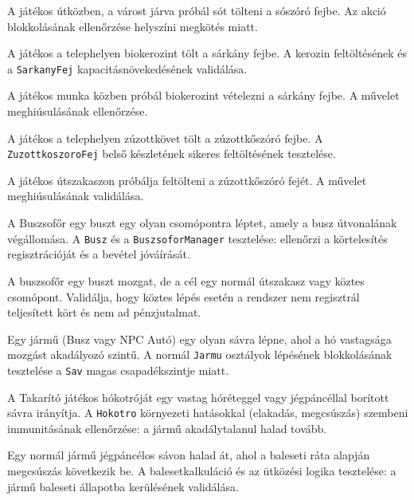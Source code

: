 {A játékos útközben, a várost járva próbál sót tölteni a sószóró fejbe.}
{Az akció blokkolásának ellenőrzése helyszíni megkötés miatt.}

{A játékos a telephelyen biokerozint tölt a sárkány fejbe.}
{A kerozin feltöltésének és a \texttt{SarkanyFej} kapacitásnövekedésének validálása.}

{A játékos munka közben próbál biokerozint vételezni a sárkány fejbe.}
{A művelet meghiúsulásának ellenőrzése.}

{A játékos a telephelyen zúzottkövet tölt a zúzottkőszóró fejbe.}
{A \texttt{ZuzottkoszoroFej} belső készletének sikeres feltöltésének tesztelése.}

{A játékos útszakaszon próbálja feltölteni a zúzottkőszóró fejét.}
{A művelet meghiúsulásának validálása.}


{A Buszsofőr egy buszt egy olyan csomópontra léptet, amely a busz útvonalának végállomása.}
{A \texttt{Busz} és a \texttt{BuszsoforManager} tesztelése: ellenőrzi a körtelesítés regisztrációját és a bevétel jóváírását.}

{A buszsofőr egy buszt mozgat, de a cél egy normál útszakasz vagy köztes csomópont.}
{Validálja, hogy köztes lépés esetén a rendszer nem regisztrál teljesített kört és nem ad pénzjutalmat.}

{Egy jármű (Busz vagy NPC Autó) egy olyan sávra lépne, ahol a hó vastagsága mozgást akadályozó szintű.}
{A normál \texttt{Jarmu} osztályok lépésének blokkolásának tesztelése a \texttt{Sav} magas csapadékszintje miatt.}

{A Takarító játékos hókotróját egy vastag hóréteggel vagy jégpáncéllal borított sávra irányítja.}
{A \texttt{Hokotro} környezeti hatásokkal (elakadás, megcsúszás) szembeni immunitásának ellenőrzése: a jármű akadálytalanul halad tovább.}

{Egy normál jármű jégpáncélos sávon halad át, ahol a baleseti ráta alapján megcsúszás következik be.}
{A balesetkalkuláció és az ütközési logika tesztelése: a jármű baleseti állapotba kerülésének validálása.}

